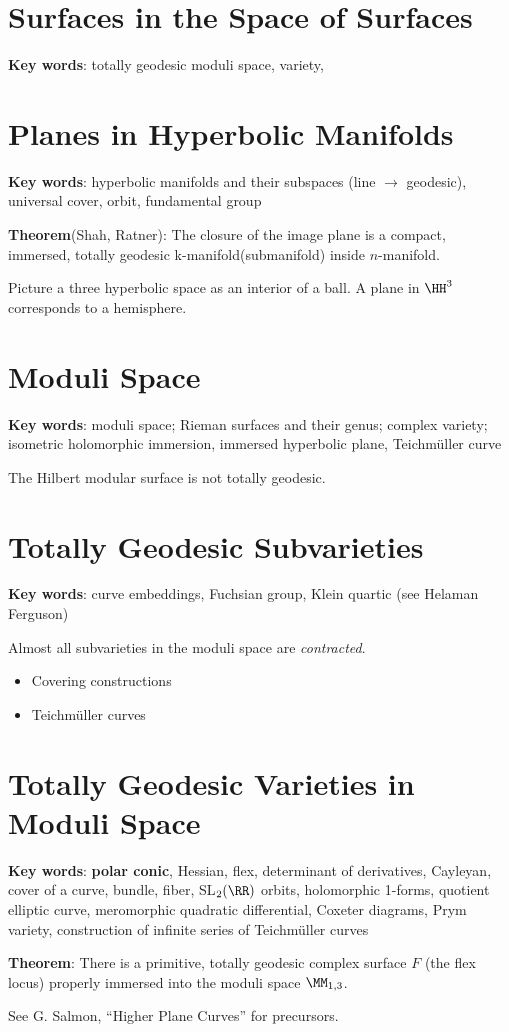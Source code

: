 \documentclass[11pt]{scrartcl}
\begin{document}
\section{Surfaces in the Space of Surfaces}

\textbf{Key words}: totally geodesic moduli space, variety,

\section{Planes in Hyperbolic Manifolds}

\textbf{Key words}: hyperbolic manifolds and their subspaces (line
$\to$ geodesic), universal cover, orbit, fundamental group

\textbf{Theorem}(Shah, Ratner): The closure of the image plane is a
compact, immersed, totally geodesic k-manifold(submanifold) inside
$n$-manifold.

Picture a three hyperbolic space as an interior of a ball. A plane in
$\HH^{3}$ corresponds to a hemisphere.

\section{Moduli Space}

\textbf{Key words}: moduli space; Rieman surfaces and their genus;
complex variety; isometric holomorphic immersion, immersed hyperbolic
plane, Teichm\"uller curve

The Hilbert modular surface is not totally geodesic.

\section{Totally Geodesic Subvarieties}

\textbf{Key words}: curve embeddings, Fuchsian group, Klein quartic
(see Helaman Ferguson)

Almost all subvarieties in the moduli space are \textit{contracted}.

\begin{itemize}
\item Covering constructions
\item Teichm\"uller curves
\end{itemize}

\section{Totally Geodesic Varieties in Moduli Space}
\textbf{Key words}: \textbf{polar conic}, Hessian, flex, determinant
of derivatives, Cayleyan, cover of a curve, bundle, fiber,
SL$_{2}(\RR)$ orbits, holomorphic 1-forms, quotient elliptic curve,
meromorphic quadratic differential, Coxeter diagrams, Prym variety,
construction of infinite series of Teichm\"uller curves

\textbf{Theorem}: There is a primitive, totally
geodesic complex surface $F$ (the flex locus) properly immersed into
the moduli space $\MM_{1, 3}$.

See G. Salmon, ``Higher Plane Curves'' for precursors.
\end{document}
